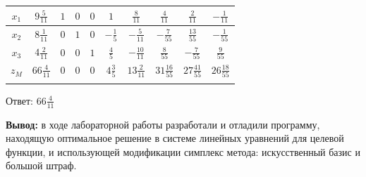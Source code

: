 \documentclass[a4paper,14pt]{extarticle}
\begin{document}
\begin{center}
\begin{tabular}{|c|c|c|c|c|c|c|c|c|c|}
        \hline
        $x_1$            & $9\frac{5}{11}$    & $1$               & $0$                & $0$              & $1$              & $\frac{8}{11}$    & $\frac{4}{11}$    & $\frac{2}{11}$    & $-\frac{1}{11}$   \\
        \hline
        $x_2$            & $8\frac{1}{11}$    & $0$               & $1$                & $0$              & $-\frac{1}{5}$   & $-\frac{5}{11}$   & $-\frac{7}{55}$   & $\frac{13}{55}$   & $-\frac{1}{55}$   \\
        \hline
        $x_3$            & $4\frac{2}{11}$    & $0$               & $0$                & $1$              & $\frac{4}{5}$    & $-\frac{10}{11}$  & $\frac{8}{55}$    & $-\frac{7}{55}$   & $\frac{9}{55}$    \\
        \hline
        $z_M$            & $66\frac{4}{11}$   & $0$               & $0$                & $0$              & $4\frac{3}{5}$   & $13\frac{2}{11}$  & $31\frac{16}{55}$ & $27\frac{41}{55}$ & $26\frac{18}{55}$ \\
        \hline
        \multicolumn{10}{c}{}
    \end{tabular}
\end{center}

Ответ: $66\frac{4}{11}$

\textbf{Вывод: } в ходе лабораторной работы разработали и отладили программу, находящую
оптимальное решение в системе линейных уравнений для целевой функции, и использующей
модификации симплекс метода: искусственный базис и большой штраф.
\end{document}
